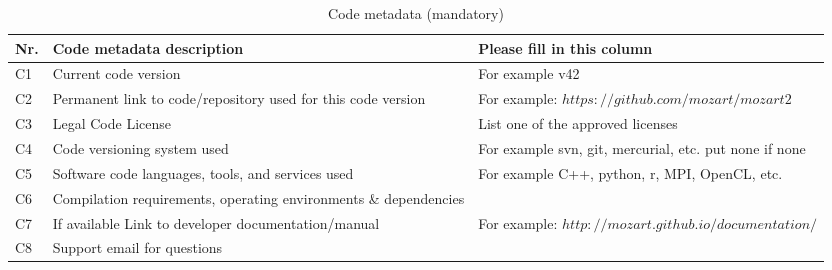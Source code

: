 \documentclass[preprint,12pt, a4paper]{elsarticle}
\begin{document}
\begin{table}[!ht]
\begin{tabular}{|l|p{6.5cm}|p{6.5cm}|}
\hline
\textbf{Nr.}                                                     & 
\textbf{Code metadata description}                               & 
\textbf{Please fill in this column}                              \\
\hline
C1                                                               & 
Current code version                                             & 
For example v42                                                  \\
\hline
C2                                                               & 
Permanent link to code/repository used for this code version     & 
For example: $https://github.com/mozart/mozart2$                 \\
\hline
C3                                                               & 
Legal Code License                                               & 
List one of the approved licenses                                \\
\hline
C4                                                               & 
Code versioning system used                                      & 
For example svn, git, mercurial, etc. put none if none           \\
\hline
C5                                                               & 
Software code languages, tools, and services used                & 
For example C++, python, r, MPI, OpenCL, etc.                    \\
\hline
C6                                                               & 
Compilation requirements, operating environments \& dependencies & 
                                                                 \\
\hline
C7                                                               & 
If available Link to developer documentation/manual              & 
For example: $http://mozart.github.io/documentation/$            \\
\hline
C8                                                               & 
Support email for questions                                      & 
                                                                 \\
\hline
\end{tabular}
\caption{Code metadata (mandatory)}\label{tab:src_metadata} 
\end{table}
\end{document}
